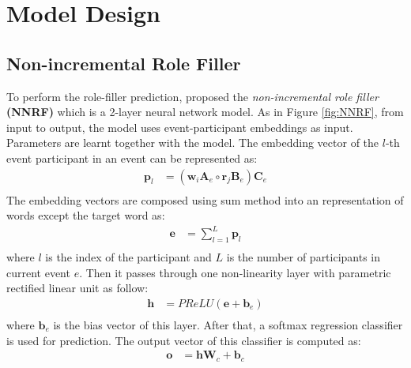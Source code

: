 \documentclass[a4paper]{article}
\begin{document}
\section{Model Design}
\subsection{Non-incremental Role Filler} \label{sec:nnrf}
To perform the role-filler prediction, \citet{tilk2016event} proposed the \textit{non-incremental role filler} \textbf{(NNRF)} which is a 2-layer neural network model. As in Figure \ref{fig:NNRF}, from input to output, the model uses event-participant embeddings as input. Parameters are learnt together with the model. The embedding vector of the $l$-th event participant in an event can be represented as:
\begin{equation} \label{eq:rbe_nnrf}
\begin{aligned}
    \mathbf{p}_l
        &= (\mathbf{w}_i \mathbf{A}_e \circ \mathbf{r}_j \mathbf{B}_e) \mathbf{C}_e \\
\end{aligned}
\end{equation}
The embedding vectors are composed using sum method into an representation of words except the target word as:
\begin{equation} \label{eq:mean_comp}
\begin{aligned}
    \mathbf{e}
        &= \sum_{l=1}^{L} \mathbf{p}_{l} \\
\end{aligned}
\end{equation}
where $l$ is the index of the participant and $L$ is the number of participants in current event $e$. Then it passes through one non-linearity layer with parametric rectified linear unit \citep{he2015delving} as follow:
\begin{equation} \label{eq:nonlinearity}
\begin{aligned}
    \mathbf{h}
        &= PReLU(\mathbf{e} + \mathbf{b}_e) \\
\end{aligned}
\end{equation}
where $\mathbf{b}_e$ is the bias vector of this layer. After that, a softmax regression classifier is used for prediction. The output vector of this classifier is computed as:
\begin{equation} \label{eq:output}
\begin{aligned}
    \mathbf{o}
        &= \mathbf{h}\mathbf{W}_c + \mathbf{b}_c \\
\end{aligned}
\end{equation}
\end{document}
